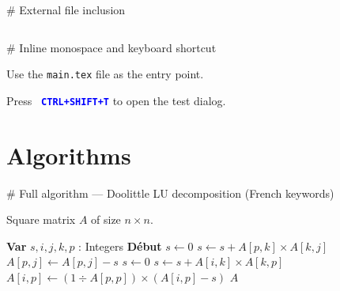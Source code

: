 \documentclass[12pt, a4paper]{article}
\newcommand{\VarNoIndent}{\State \hspace{-0.8cm} \textbf{Var}}
\newcommand{\DebutNoIndent}{\State \hspace{-0.8cm} \textbf{Début}}
\newcommand{\snippetlabel}[1]{%
    \vspace{0.5em}%
    {\small\ttfamily\color{gray} \# #1}%
    \vspace{0.2em}%
}
\begin{document}
\snippetlabel{External file inclusion}

\begin{lstlisting}[language={[LaTeX]TeX}, basicstyle=\ttfamily\small,
                   frame=single, backgroundcolor=\color{gray!5}]

\end{lstlisting}

\snippetlabel{Inline monospace and keyboard shortcut}

\begin{LTXexample}[pos=r, width=0.4]
Use the \texttt{main.tex} file
as the entry point.

Press \texttt{\textbf{%
\textcolor{blue}{CTRL+SHIFT+T}}}
to open the test dialog.
\end{LTXexample}

\section{Algorithms}

\snippetlabel{Full algorithm — Doolittle LU decomposition (French keywords)}

\begin{algorithm}[H]
    \caption{Doolittle LU Decomposition}
    \label{alg:doolittle}
    \begin{algorithmic}[1]
        \Require Square matrix $A$ of size $n \times n$.

        \VarNoIndent{}
            \State $s, i, j, k, p$ : Integers
        \DebutNoIndent
                    \State $s \gets 0$
                        \State $s \gets s + A[p,k] \times A[k,j]$
                    \EndFor
                    \State $A[p,j] \gets A[p,j] - s$
                \EndFor
                    \State $s \gets 0$
                        \State $s \gets s + A[i,k] \times A[k,p]$
                    \EndFor
                    \State $A[i,p] \gets (1 \div A[p,p]) \times (A[i,p] - s)$
                \EndFor
            \EndFor
            \State \Return $A$
        \EndFunction
    \end{algorithmic}
\end{algorithm}
\end{document}
